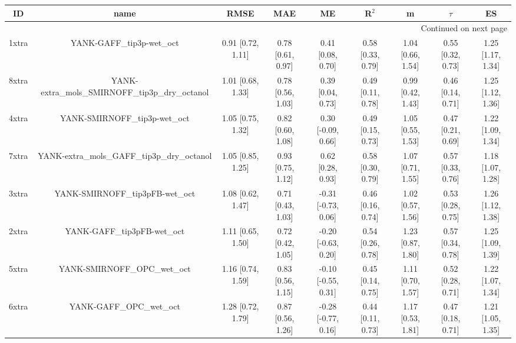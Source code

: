 \documentclass{article}
\begin{document}
\begin{center}
\scriptsize
\begin{longtable}{|ccccccccc|}
\toprule
    ID &                                             name &               RMSE &                MAE &                   ME &              R$^2$ &                  m &             $\tau$ &                 ES \\
\midrule
\endhead
\midrule
\multicolumn{9}{r}{{Continued on next page}} \\
\midrule
\endfoot

\bottomrule
\endlastfoot
 1xtra &                        YANK-GAFF\_tip3p-wet\_oct &  0.91 [0.72, 1.11] &  0.78 [0.61, 0.97] &    0.41 [0.08, 0.70] &  0.58 [0.33, 0.79] &  1.04 [0.66, 1.54] &  0.55 [0.32, 0.73] &  1.25 [1.17, 1.34] \\
 8xtra &  YANK-extra\_mols\_SMIRNOFF\_tip3p\_dry\_octanol &  1.01 [0.68, 1.33] &  0.78 [0.56, 1.03] &    0.39 [0.04, 0.73] &  0.49 [0.11, 0.78] &  0.99 [0.42, 1.43] &  0.46 [0.14, 0.71] &  1.25 [1.12, 1.36] \\
 4xtra &                    YANK-SMIRNOFF\_tip3p-wet\_oct &  1.05 [0.75, 1.32] &  0.82 [0.60, 1.08] &   0.30 [-0.09, 0.66] &  0.49 [0.15, 0.73] &  1.05 [0.55, 1.53] &  0.47 [0.21, 0.69] &  1.22 [1.09, 1.34] \\
 7xtra &      YANK-extra\_mols\_GAFF\_tip3p\_dry\_octanol &  1.05 [0.85, 1.25] &  0.93 [0.75, 1.12] &    0.62 [0.28, 0.93] &  0.58 [0.30, 0.79] &  1.07 [0.71, 1.55] &  0.57 [0.33, 0.76] &  1.18 [1.07, 1.28] \\
 3xtra &                  YANK-SMIRNOFF\_tip3pFB-wet\_oct &  1.08 [0.62, 1.47] &  0.71 [0.43, 1.03] &  -0.31 [-0.73, 0.06] &  0.46 [0.16, 0.74] &  1.02 [0.57, 1.56] &  0.53 [0.28, 0.75] &  1.26 [1.12, 1.38] \\
 2xtra &                      YANK-GAFF\_tip3pFB-wet\_oct &  1.11 [0.65, 1.50] &  0.72 [0.42, 1.05] &  -0.20 [-0.63, 0.20] &  0.54 [0.26, 0.78] &  1.23 [0.87, 1.80] &  0.57 [0.34, 0.78] &  1.25 [1.09, 1.39] \\
 5xtra &                     YANK-SMIRNOFF\_OPC\_wet\_oct &  1.16 [0.74, 1.59] &  0.83 [0.56, 1.15] &  -0.10 [-0.55, 0.31] &  0.45 [0.14, 0.75] &  1.11 [0.70, 1.57] &  0.52 [0.28, 0.71] &  1.22 [1.07, 1.34] \\
 6xtra &                         YANK-GAFF\_OPC\_wet\_oct &  1.28 [0.72, 1.79] &  0.87 [0.56, 1.26] &  -0.28 [-0.77, 0.16] &  0.44 [0.11, 0.73] &  1.17 [0.53, 1.81] &  0.47 [0.18, 0.71] &  1.21 [1.05, 1.35] \\
\end{longtable}
\end{center}
\end{document}
